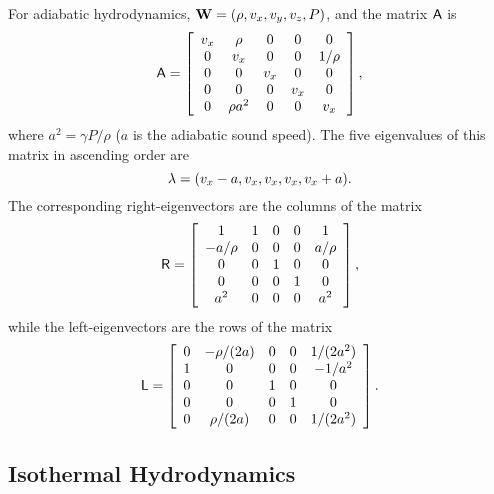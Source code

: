 For adiabatic hydrodynamics, ${\bf W} = (\rho, v_{x}, v_{y}, v_{z}, P)$,
and the matrix ${\sf A}$ is
\begin{equation}
{\sf A} = \left[ \begin{array}{ccccc}
v_{x} & \rho       & 0     & 0     & 0      \\
0     & v_{x}      & 0     & 0     & 1/\rho \\
0     & 0          & v_{x} & 0     & 0      \\
0     & 0          & 0     & v_{x} & 0      \\
0     & \rho a^{2} & 0     & 0     & v_{x}  \end{array} \right] ,
\end{equation}
where $a^{2} = \gamma P/\rho$ ($a$ is the adiabatic sound speed).
The five eigenvalues of this matrix in ascending order are
\begin{equation}
{\bf \lambda} = (v_{x}-a, v_{x}, v_{x}, v_{x}, v_{x}+a).
\end{equation}
The corresponding right-eigenvectors are the columns of the matrix
\begin{equation}
{\sf R}  = \left[ \begin{array}{ccccc}
1       & 1 & 0 & 0 & 1      \\
-a/\rho & 0 & 0 & 0 & a/\rho \\
0       & 0 & 1 & 0 & 0      \\
0       & 0 & 0 & 1 & 0      \\
a^{2}   & 0 & 0 & 0 & a^{2}  \end{array} \right] ,
\end{equation}
while the left-eigenvectors are the rows of the matrix
\begin{equation}
{\sf L}  = \left[ \begin{array}{ccccc}
0 & -\rho/(2a) & 0 & 0 & 1/(2a^{2}) \\
1 &  0       & 0 & 0 & -1/a^{2} \\
0 &  0       & 1 & 0 &  0       \\
0 &  0       & 0 & 1 &  0       \\
0 & \rho/(2a)  & 0 & 0 & 1/(2a^{2}) \end{array} \right] .
\end{equation}

\subsection{Isothermal Hydrodynamics}


